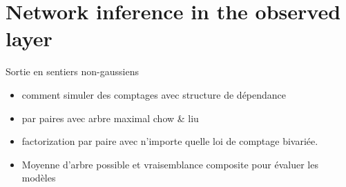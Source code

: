 \section{Network inference in the observed layer}
Sortie en sentiers non-gaussiens
\begin{itemize}
\item comment simuler des comptages avec structure de dépendance
\item par paires avec arbre maximal chow \& liu
\item factorization par paire avec n'importe quelle loi de comptage bivariée. 
\item Moyenne d'arbre possible et vraisemblance composite pour évaluer les modèles
\end{itemize}
